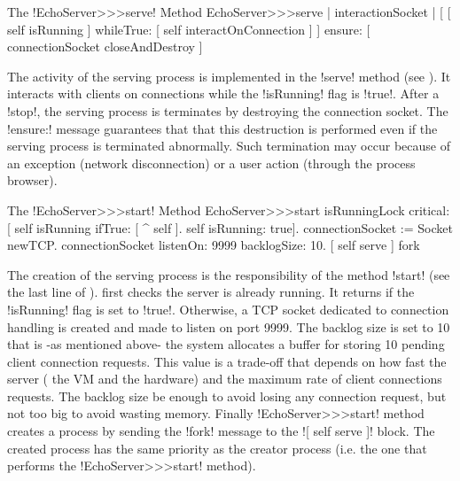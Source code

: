 \documentclass[a4paper,10pt,twoside]{book}
\begin{document}
\begin{method}{The \ct!EchoServer>>>serve! Method}
EchoServer>>>serve
	| interactionSocket |
	[ [ self isRunning ]
		whileTrue: [ self interactOnConnection ] ]
		ensure: [ connectionSocket closeAndDestroy ]
\end{method}

The activity of the serving process is implemented in the \ct!serve! method (see ).
It interacts with clients on connections while the \ct!isRunning! flag is \ct!true!.
After a \ct!stop!, the serving process is terminates by destroying the connection socket.
The \ct!ensure:! message guarantees that that this destruction is performed even if the serving process is terminated abnormally. 
Such termination may occur because of an exception (\eg network disconnection) or a user action (\eg through the process browser).   

\begin{method}{The \ct!EchoServer>>>start! Method}
EchoServer>>>start
	isRunningLock critical: [
		self isRunning ifTrue: [ ^ self ].
		self isRunning: true].
	connectionSocket := Socket newTCP.
	connectionSocket listenOn: 9999 backlogSize: 10.
	[ self serve ] fork
\end{method}

The creation of the serving process is the responsibility of the method \ct!start! (see the last line of ).
 first checks  the server is already running.
It returns if the \ct!isRunning! flag is set to \ct!true!.
Otherwise, a TCP socket dedicated to connection handling is created and made to listen on port 9999.
The backlog size is set to 10 that is -as mentioned above- the system allocates a buffer for storing 10 pending client connection requests.
This value is a trade-off that depends on how fast  the server  ( the VM and the hardware) and the maximum rate of client connections requests.
The backlog size  be  enough to avoid losing any connection request, but not too big to avoid wasting memory.
Finally \ct!EchoServer>>>start! method creates a process by sending the \ct!fork! message to the \ct![ self serve ]! block.
The created process has the same priority as the creator process (i.e. the one that performs the \ct!EchoServer>>>start! method).
\end{document}
